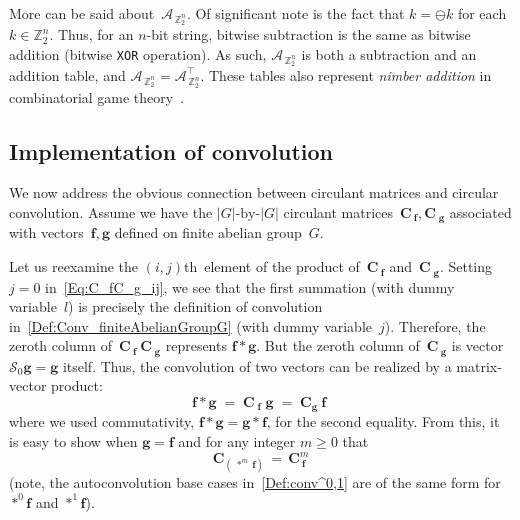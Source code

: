 \documentclass[letterpaper,11pt]{article}
\newcommand{\bs}[1]{{\boldsymbol{#1}}}
\newcommand{\gr}[1]{( #1 )}
\newcommand{\abs}[1]{\vert #1 \vert}
\newcommand{\Int}{\mathbb Z}
\newcommand{\conv}{\ast}
\newcommand{\bcode}[1]{\texttt{#1}}
\newcommand{\ijth}{$(i,j)$th}
\theoremstyle{definition} \newtheorem{remark}{Remark}
\begin{document}
More can be said about~$\bs{\mathcal{A}}_{\,\Int_2^n}$. Of significant note is the fact that $k=\ominus k$ for each $k\in\Int_2^n$. Thus, for an $n$-bit string, bitwise subtraction is the same as bitwise addition (bitwise \bcode{XOR} operation). As such, $\bs{\mathcal{A}}_{\,\Int_2^n}$ is both a subtraction and an addition table, and $\bs{\mathcal{A}}_{\,\Int_2^n} = \bs{\mathcal{A}}_{\,\Int_2^n}^\top$. These tables also represent \emph{nimber addition} in combinatorial game theory~\cite{berlekamp2000WinningWaysMathematicalPlays}.


\subsection{Implementation of convolution}
We now address the obvious connection between circulant matrices and circular convolution. Assume we have the $\abs{G}\text{-by-}\abs{G}$ circulant matrices~$\bs{C}_{\:\!\!\bs{f}},\bs{C}_{\;\!\!\bs{g}}$ associated with vectors~$\bs{f},\bs{g}$ defined on finite abelian group~$G$.

Let us reexamine the \ijth\ element of the product of~$\bs{C}_{\:\!\!\bs{f}}$ and~$\bs{C}_{\;\!\!\bs{g}}$. Setting ${j=0}$ in~\eqref{Eq:C_fC_g_ij}, we see that the first summation (with dummy variable~$l$) is precisely the definition of convolution in~\eqref{Def:Conv_finiteAbelianGroupG} (with dummy variable~$j$). Therefore, the zeroth column of~$\bs{C}_{\:\!\!\bs{f}}\:\!\bs{C}_{\;\!\!\bs{g}}$ represents $\bs{f} \conv \bs{g}$. But the zeroth column of~$\bs{C}_{\:\!\!\bs{g}}$ is vector~$\mathcal{S}_0\bs{g}=\bs{g}$ itself. Thus, the convolution of two vectors can be realized by a matrix-vector product:
\begin{equation} \label{Eq:Conv_f*g=C_fg}
\bs{f} \conv \bs{g} \;=\; \bs{C}_{\;\!\!\bs{f}} \;\! \bs{g} \;=\;
\bs{C}_{\bs{g}} \:\! \bs{f} \;
\end{equation}
where we used commutativity, $\bs{f} \conv \bs{g} = \bs{g} \conv \bs{f}$, for the second equality. From this, it is easy to show when $\bs{g}=\bs{f}$ and for any integer $m\geq0$ that
\begin{equation} \label{Eq:C_*^mf=C_f^m}
\bs{C}_{\gr{\:\!\!\conv^m\:\!\!\bs{f}}} \,=\, \bs{C}_{\:\!\!\bs{f}}^m
\end{equation}
(note, the autoconvolution base cases in~\eqref{Def:conv^0,1} are of the same form for $\conv^0\bs{f}$ and $\conv^1\bs{f}$).
\end{document}
